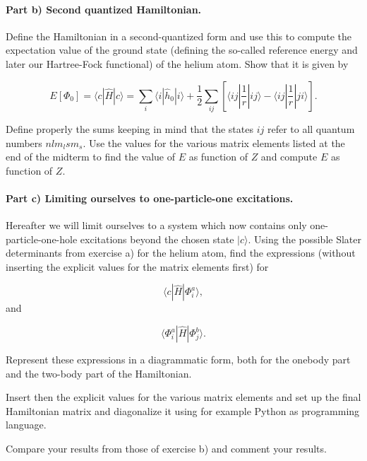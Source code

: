 \documentclass[a4,10pt]{article}
\begin{document}
\paragraph{Part b) Second quantized Hamiltonian.}
Define the Hamiltonian in a second-quantized form and use this to
compute the expectation value of the ground state (defining the
so-called reference energy and later our Hartree-Fock functional) of
the helium atom.  Show that it is given by

\begin{equation*}
  E[\Phi_0] = \langle c | \hat{H}| c \rangle 
  = \sum_{i} \langle i | \hat{h}_0 | i\rangle+ \frac{1}{2}\sum_{ij}\left[\langle ij |\frac{1}{r}|ij\rangle-\langle ij |\frac{1}{r}|ji\rangle\right].
\end{equation*}

Define properly the sums keeping in mind that the states $ij$ refer to
all quantum numbers $nlm_lsm_s$.  Use the values for the various
matrix elements listed at the end of the midterm to find the value of
$E$ as function of $Z$ and compute $E$ as function of $Z$.

\paragraph{Part c) Limiting ourselves to one-particle-one excitations.}
Hereafter we will limit ourselves to a system which now contains only
one-particle-one-hole excitations beyond the chosen state $|c\rangle$.
Using the possible Slater determinants from exercise a) for the helium
atom, find the expressions (without inserting the explicit values for
the matrix elements first) for

\begin{equation*}
\langle c | \hat{H}| \Phi_i^a \rangle,
\end{equation*}
and

\begin{equation*}
\langle \Phi_i^a | \hat{H}| \Phi_j^b \rangle.
\end{equation*}

Represent these expressions in a diagrammatic form, both for the
onebody part and the two-body part of the Hamiltonian.

Insert then the explicit values for the various matrix elements and
set up the final Hamiltonian matrix and diagonalize it using for
example Python as programming language. 

Compare your results from those of exercise b) and comment your results. 
\end{document}
